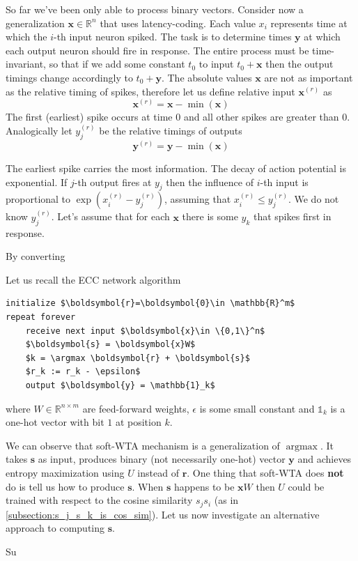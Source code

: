 \documentclass[oneside,english,logo]{amuthesis}
\DeclareMathOperator*{\argmax}{argmax}
\begin{document}
So far we've been only able to process binary vectors. 
Consider now a generalization $\boldsymbol{x}\in\mathbb{R}^n$ that uses latency-coding.
Each value $x_i$ represents time at which the $i$-th input neuron spiked. The task is to determine times $\boldsymbol{y}$ at which each output neuron should fire in response. The
entire process must be time-invariant, so that if we add some constant $t_0$ to input $t_0+\boldsymbol{x}$ then the
output timings change accordingly to $t_0+\boldsymbol{y}$. 
The absolute values $\boldsymbol{x}$ are not as important as the relative timing of spikes, therefore let us define relative input $\boldsymbol{x}^(r)$  as
\[
\boldsymbol{x}^(r) = \boldsymbol{x} - \min(\boldsymbol{x})
\]
The first (earliest) spike occurs at time $0$ and all other spikes are greater than $0$. Analogically let $y_j^(r)$ be the relative timings of outputs 
\[
\boldsymbol{y}^(r) = \boldsymbol{y} - \min(\boldsymbol{x})
\]

The earliest spike carries the most information. The decay of action potential is exponential. If $j$-th output fires at $y_j$ then the influence of $i$-th input is proportional to $\exp (x_i^{(r)} - y_j^{(r)})$, assuming that $x_i^{(r)} \le y_j^{(r)}$.  We do not know $y_j^{(r)}$. Let's assume that for each $\boldsymbol{x}$ there is some $y_k$ that spikes first in response.  

By converting 

Let us recall the ECC network algorithm
\begin{lstlisting}
initialize $\boldsymbol{r}=\boldsymbol{0}\in \mathbb{R}^m$
repeat forever
    receive next input $\boldsymbol{x}\in \{0,1\}^n$
    $\boldsymbol{s} = \boldsymbol{x}W$
    $k = \argmax \boldsymbol{r} + \boldsymbol{s}$
    $r_k := r_k - \epsilon$ 
    output $\boldsymbol{y} = \mathbb{1}_k$
\end{lstlisting}
where $W\in\mathbb{R}^{n\times m}$ are feed-forward weights, $\epsilon$ is some small constant and $\mathbb{1}_k$ is a one-hot vector with bit $1$ at position $k$.

We can observe that soft-WTA mechanism is a generalization of $\argmax$. It takes $\boldsymbol{s}$ as input, produces binary (not necessarily one-hot) vector $\boldsymbol{y}$ and achieves entropy maximization using $U$ instead of $\boldsymbol{r}$. One thing that soft-WTA does \textbf{not} do is tell us how to produce $\boldsymbol{s}$. When $\boldsymbol{s}$ happens to be $\boldsymbol{x}W$ then $U$ could be trained with respect to the cosine similarity $s_j s_i$ (as in \ref{subsection:s_j_s_k_is_cos_sim}). Let us now investigate an alternative approach to computing $\boldsymbol{s}$. 

Su
 








    
\end{document}
